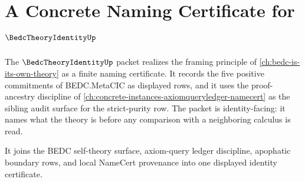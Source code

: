 \chapter{A Concrete Naming Certificate for $\BedcTheoryIdentityUp$}
\label{ch:concrete-instances-bedc-theory-identity-namecert}

The $\BedcTheoryIdentityUp$ packet realizes the framing principle of \autoref{ch:bedc-is-its-own-theory} as a finite naming certificate. It records the five positive commitments of BEDC.MetaCIC as displayed rows, and it uses the proof-ancestry discipline of \autoref{ch:concrete-instances-axiomqueryledger-namecert} as the sibling audit surface for the strict-purity row. The packet is identity-facing: it names what the theory is before any comparison with a neighboring calculus is read.

It joins the BEDC self-theory surface, axiom-query ledger discipline, apophatic boundary rows, and local NameCert provenance into one displayed identity certificate.

